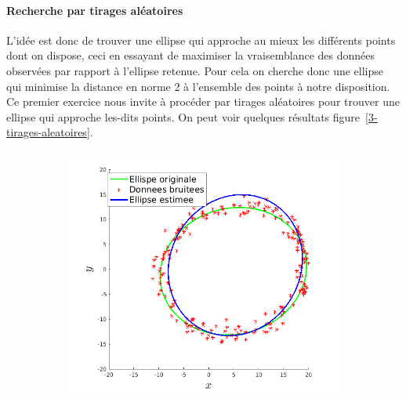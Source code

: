 \documentclass{article}
\begin{document}
\paragraph{Recherche par tirages aléatoires}
L'idée est donc de trouver une ellipse qui approche au mieux les différents points dont on dispose, ceci en essayant de maximiser la vraisemblance des données observées par rapport à l'ellipse retenue. Pour cela on cherche donc une ellipse qui minimise la distance en norme 2 à l'ensemble des points à notre disposition. Ce premier exercice nous invite à procéder par tirages aléatoires pour trouver une ellipse qui approche les-dits points. On peut voir quelques résultats figure~\ref{3-tirages-aleatoires}.
\begin{figure}[!ht]
    \centering
    \begin{subfigure}[c]{0.49\linewidth}
        \centering
        \includegraphics[width=\linewidth]{images/4-hasard_ok.png}
    \end{subfigure}
    \begin{subfigure}[c]{0.49\linewidth}
        \centering

\end{subfigure}
\end{figure}
\end{document}
